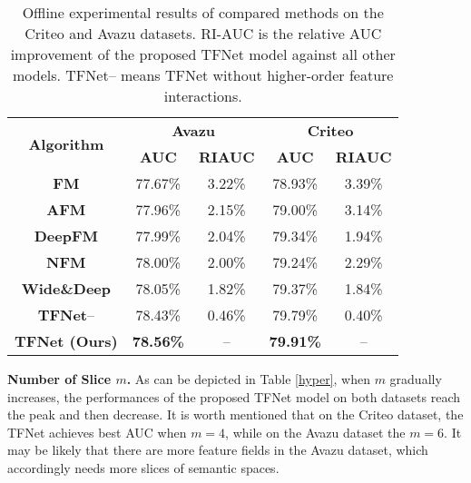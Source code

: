 \documentclass[sigconf]{acmart}
\begin{document}
\begin{table}[t]
\setlength{\abovecaptionskip}{0pt}  \setlength{\belowcaptionskip}{0pt}  \small
\centering
  \caption{Offline experimental results of compared methods on the Criteo and Avazu datasets. RI-AUC is the relative AUC improvement of the proposed TFNet model against all other models. {TFNet}-- means TFNet without higher-order feature interactions.}
\begin{tabular}{|c|c|c|c|c|}
\hline
\multirow{2}{*}{\textbf{Algorithm}} & \multicolumn{2}{c|}{\textbf{Avazu}} & \multicolumn{2}{c|}{\textbf{Criteo}} \\ \cline{2-5} 
                           & \textbf{AUC}        & \textbf{RI\text{-}AUC}   & \textbf{AUC}        & \textbf{RI\text{-}AUC}    \\ \hline
\textbf{FM}                & 77.67\%             & 3.22\%        & 78.93\%             & 3.39\%         \\ \hline
\textbf{AFM}               & 77.96\%             & 2.15\%        & 79.00\%             & 3.14\%         \\ \hline
\textbf{DeepFM}            & 77.99\%             & 2.04\%        & 79.34\%             & 1.94\%         \\ \hline
\textbf{NFM}               & 78.00\%             & 2.00\%        & 79.24\%             & 2.29\%         \\ \hline

\textbf{Wide\&Deep}        & 78.05\%             & 1.82\%        & 79.37\%             & 1.84\%         \\ \hline
\textbf{TFNet}--               & {78.43\%}    & {0.46\%}     & {79.79\%}    & {0.40\%}      \\ \hline
\textbf{TFNet (Ours)}               & \textbf{78.56\%}    & {--}     & \textbf{79.91\%}    & {--}      \\ \hline
\end{tabular}
\label{compare}
\end{table}



\noindent\textbf{Number of Slice $m$.}
As can be depicted in Table \ref{hyper}, when $m$ gradually increases, the performances of the proposed TFNet model on both datasets reach the peak and then decrease. It is worth mentioned that on the Criteo dataset, the TFNet achieves best AUC when $m=4$, while on the Avazu dataset the $m=6$. It may be likely that there are more feature fields in the Avazu dataset, which accordingly needs more slices of semantic spaces.
\end{document}
